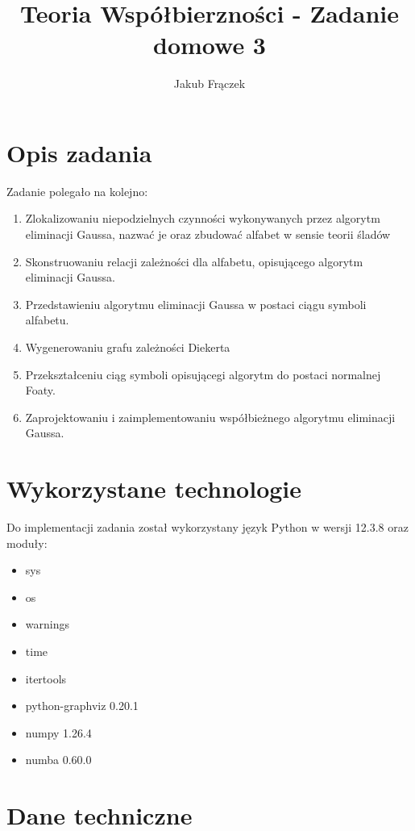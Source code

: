 \documentclass{article}
\title{Teoria Współbierzności - Zadanie domowe 3}
\author{Jakub Frączek}
\begin{document}
\maketitle

\section{Opis zadania}

Zadanie polegało na kolejno:

\begin{enumerate}
    \item Zlokalizowaniu niepodzielnych czynności wykonywanych przez algorytm eliminacji Gaussa, nazwać je oraz zbudować alfabet w sensie teorii śladów
    \item Skonstruowaniu relacji zależności dla alfabetu, opisującego algorytm eliminacji Gaussa. 
    \item Przedstawieniu algorytmu eliminacji Gaussa w postaci ciągu symboli alfabetu.
    \item Wygenerowaniu grafu zależności Diekerta
    \item Przekształceniu ciąg symboli opisującegi algorytm do postaci normalnej Foaty.
    \item Zaprojektowaniu i zaimplementowaniu współbieżnego algorytmu eliminacji Gaussa.
\end{enumerate}

\section{Wykorzystane technologie}
Do implementacji zadania został wykorzystany język Python w wersji 12.3.8 oraz moduły:

\begin{itemize}
    \item sys
    \item os
    \item warnings
    \item time
    \item itertools
    \item python-graphviz 0.20.1
    \item numpy 1.26.4
    \item numba 0.60.0
\end{itemize}

\section{Dane techniczne}
\end{document}
